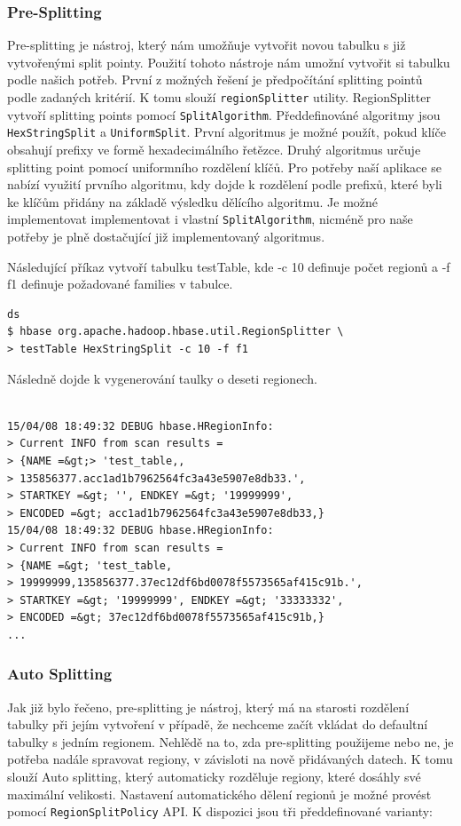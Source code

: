 \documentclass[thesis=M,czech]{FITthesis}[2012/06/26]
\begin{document}
\subsubsection{Pre-Splitting}
Pre-splitting je nástroj, který nám umožňuje vytvořit novou tabulku s již vytvořenými split pointy. Použití tohoto nástroje nám umožní vytvořit si tabulku podle našich potřeb. První z možných řešení je předpočítání splitting pointů podle zadaných kritérií. K tomu slouží \texttt{regionSplitter} utility. RegionSplitter vytvoří splitting points pomocí \texttt{SplitAlgorithm}. Předdefinováné algoritmy jsou \texttt{HexStringSplit} a \texttt{UniformSplit}. První algoritmus je možné použít, pokud klíče obsahují prefixy ve formě hexadecimálního řetězce. Druhý algoritmus určuje splitting point pomocí uniformního rozdělení klíčů. Pro potřeby naší aplikace se nabízí využití prvního algoritmu, kdy dojde k rozdělení podle prefixů, které byli ke klíčům přidány na základě výsledku dělícího algoritmu. Je možné implementovat implementovat i vlastní \texttt{SplitAlgorithm}, nicméně pro naše potřeby je plně dostačující již implementovaný algoritmus.

Následující příkaz vytvoří tabulku testTable, kde -c 10 definuje počet regionů a -f f1 definuje požadované families v tabulce.

\medskip
\begin{lstlisting}[frame=single]  % Start your code-block
ds
$ hbase org.apache.hadoop.hbase.util.RegionSplitter \
> testTable HexStringSplit -c 10 -f f1

\end{lstlisting}
\medskip
Následně dojde k vygenerování taulky o deseti regionech.
\medskip
\begin{lstlisting}[frame=single]  % Start your code-block
 
15/04/08 18:49:32 DEBUG hbase.HRegionInfo:
> Current INFO from scan results = 
> {NAME =&gt;> 'test_table,,
> 135856377.acc1ad1b7962564fc3a43e5907e8db33.', 
> STARTKEY =&gt; '', ENDKEY =&gt; '19999999', 
> ENCODED =&gt; acc1ad1b7962564fc3a43e5907e8db33,}
15/04/08 18:49:32 DEBUG hbase.HRegionInfo: 
> Current INFO from scan results = 
> {NAME =&gt; 'test_table,
> 19999999,135856377.37ec12df6bd0078f5573565af415c91b.', 
> STARTKEY =&gt; '19999999', ENDKEY =&gt; '33333332', 
> ENCODED =&gt; 37ec12df6bd0078f5573565af415c91b,}
...

\end{lstlisting}
\medskip
\subsubsection{Auto Splitting}
Jak již bylo řečeno, pre-splitting je nástroj, který má na starosti rozdělení tabulky při jejím vytvoření v případě, že nechceme začít vkládat do defaultní tabulky s jedním regionem. Nehlědě na to, zda pre-splitting použijeme nebo ne, je potřeba nadále spravovat regiony, v závisloti na nově přidávaných datech. K tomu slouží Auto splitting, který automaticky rozděluje regiony, které dosáhly své maximální velikosti. Nastavení automatického dělení regionů je možné provést pomocí \texttt{RegionSplitPolicy} API. K dispozici jsou tři předdefinované varianty:
\end{document}
